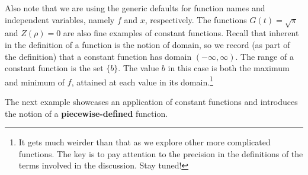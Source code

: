\documentclass{ximera}
\begin{document}
Also note that we are using the generic defaults for function names and independent variables, namely $f$ and $x$, respectively.   The functions  $G(t) = \sqrt{\pi}$ and $Z(\rho) = 0$ are also fine examples of constant functions.  Recall that inherent in the definition of a function is the notion of domain, so we record (as part of the definition) that a constant function has domain $(-\infty, \infty)$.  The range of a constant function is the set $\{b \}$.  The value $b$ in this case is both the maximum and minimum of $f$, attained at each value in its domain.\footnote{It gets much weirder than that as we explore other more complicated functions.  The key is to pay attention to the precision in the definitions of the terms involved in the discussion. Stay tuned!}\label{rangeofconstantismaxandmin}

The next example showcases an application of constant functions and introduces the notion of a \textbf{piecewise-defined} function.
\end{document}
